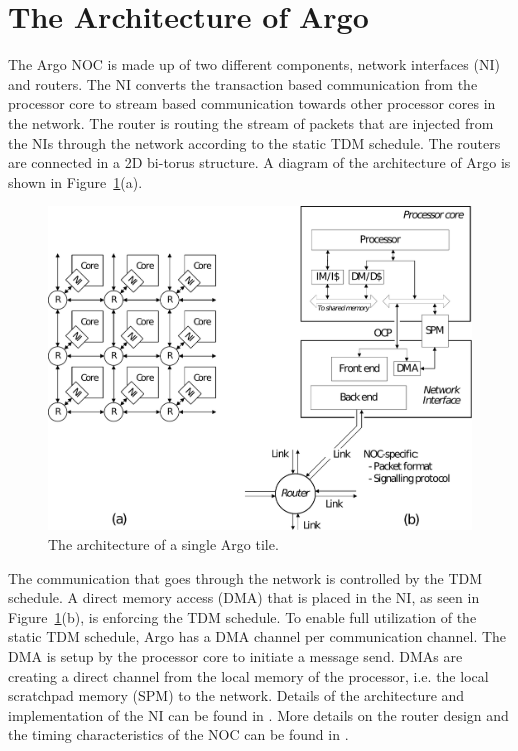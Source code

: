 \documentclass[a4paper,fontsize=10pt,twoside,DIV15,BCOR12mm,headinclude=true,footinclude=false,pagesize,bibtotoc]{scrbook}
\begin{document}
\section{The Architecture of Argo}
\label{sec:arch}

The Argo NOC is made up of two different components,
network interfaces (NI) and routers.
The NI converts the transaction based communication from the processor core to
stream based communication towards other processor cores in the network.
The router is routing the stream of packets that are injected from the NIs
through the network according to the static TDM schedule.
The routers are connected in a 2D bi-torus structure.
A diagram of the architecture of Argo is shown in Figure~\ref{fig:diag}(a).

\begin{figure}
\centering
\includegraphics[scale=0.5]{fig/argo.pdf}
\caption{The architecture of a single Argo tile.}
\label{fig:diag}
\end{figure}

The communication that goes through the network is controlled by the TDM schedule.
A direct memory access (DMA) that is placed in the NI, as seen in Figure~\ref{fig:diag}(b),
is enforcing the TDM schedule.
To enable full utilization of the static TDM schedule,
Argo has a DMA channel per communication channel. 
The DMA is setup by the processor core to initiate a message send.
DMAs are creating a direct
channel from the local memory of the processor, i.e. the local scratchpad memory (SPM)
to the network. Details of the architecture and implementation of the NI can be found in \cite{tdmna}.
More details on the router design and the timing characteristics of the NOC can be found in
\cite{noc-elasticity}.
\end{document}
